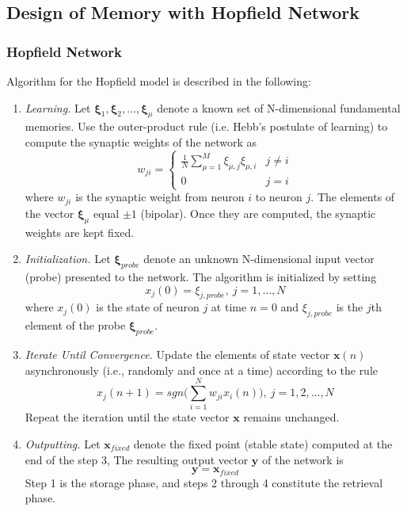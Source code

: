\subsection{Design of Memory with Hopfield Network}

\subsubsection{Hopfield Network}

Algorithm for the Hopfield model is described in the following:

\begin{enumerate}
	\item \textit{Learning.} Let \( \boldsymbol{\xi}_1, \boldsymbol{\xi}_2, ..., \boldsymbol{\xi}_{\mu} \) denote a known set of N-dimensional fundamental memories. Use the outer-product rule (i.e. Hebb's postulate of learning) to compute the synaptic weights of the network as 
	\begin{equation}
		w_{ji} =
			\begin{cases}
				\frac{1}{N} \sum_{\mu=1}^{M}\xi_{\mu,j}\xi_{\mu,i}	& j \neq i \\
				0																										& j = i 
			\end{cases}
	\end{equation}
	where \(w_{ji}\) is the synaptic weight from neuron \(i\) to neuron \(j\). The elements of the vector \( \boldsymbol{\xi}_\mu \) equal \(\pm 1\) (bipolar). Once they are computed, the synaptic weights are kept fixed.
	
	\item \textit{Initialization.} Let \( \boldsymbol{\xi}_{probe} \) denote an unknown N-dimensional input vector (probe) presented to the network. The algorithm is initialized by setting
	\begin{equation}
		x_j(0) = \xi_{j,probe}, \> j = 1,...,N
	\end{equation}
	where \( x_j(0) \) is the state of neuron \(j\) at time \(n = 0\) and \( \xi_{j,probe} \) is the \(j\)th element of the probe \( \boldsymbol{\xi}_{probe} \).
	
	\item \textit{Iterate Until Convergence.} Update the elements of state vector \( \boldsymbol{x}(n) \) asynchronously (i.e., randomly and once at a time) according to the rule
	\begin{equation}
		x_j(n+1)=sgn \Bigg(\sum_{i=1}^{N} w_{ji}x_i(n) \Bigg), \> j = 1,2, ..., N
	\end{equation}
	Repeat the iteration until the state vector \( \boldsymbol{x} \) remains unchanged.
	
	\item \textit{Outputting.} Let \( \boldsymbol{x}_{fixed} \) denote the fixed point (stable state) computed at the end of the step 3, The resulting output vector \( \boldsymbol{y} \) of the network is
	\begin{equation}
		\boldsymbol{y} = \boldsymbol{x}_{fixed}
	\label{eq:}
	\end{equation}
	Step 1 is the storage phase, and steps 2 through 4 constitute the retrieval phase.
\end{enumerate}

